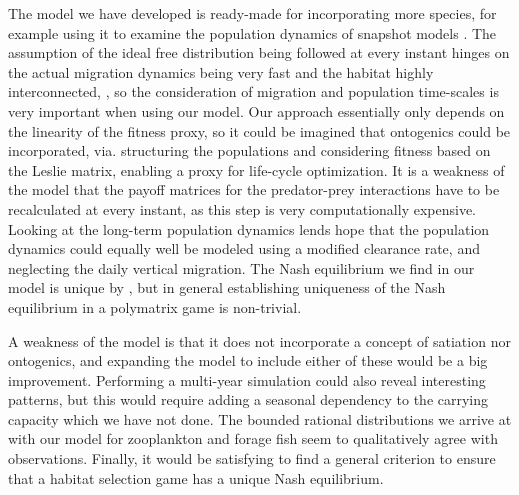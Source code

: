 





The model we have developed is ready-made for incorporating more species, for example using it to examine the population dynamics of snapshot models \citep{pinti2019trophic}. The assumption of the ideal free distribution being followed at every instant hinges on the actual migration dynamics being very fast and the habitat highly interconnected, \citep{cressman2006migration}, so the consideration of migration and population time-scales is very important when using our model. Our approach essentially only depends on the linearity of the fitness proxy, so it could be imagined that ontogenics could be incorporated, via. structuring the populations and considering fitness based on the Leslie matrix, enabling a proxy for life-cycle optimization. It is a weakness of the model that the payoff matrices for the predator-prey interactions have to be recalculated at every instant, as this step is very computationally expensive. Looking at the long-term population dynamics lends hope that the population dynamics could equally well be modeled using a modified clearance rate, and neglecting the daily vertical migration. The Nash equilibrium we find in our model is unique by \citep{verticalmigration}, but in general establishing uniqueness of the Nash equilibrium in a polymatrix game is non-trivial.

A weakness of the model is that it does not incorporate a concept of satiation nor ontogenics, and expanding the model to include either of these would be a big improvement. Performing a multi-year simulation could also reveal interesting patterns, but this would require adding a seasonal dependency to the carrying capacity which we have not done. The bounded rational distributions we arrive at with our model for zooplankton and forage fish seem to qualitatively agree with observations. Finally, it would be satisfying to find a general criterion to ensure that a habitat selection game has a unique Nash equilibrium.


